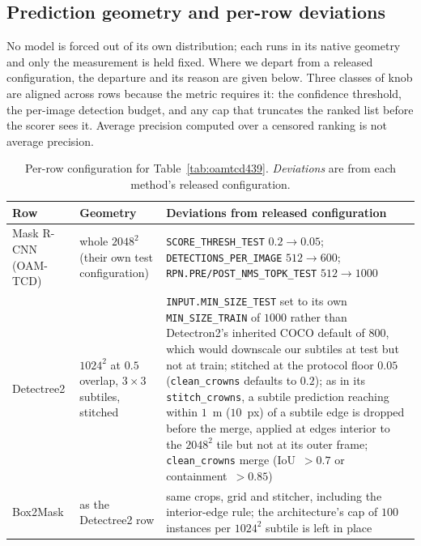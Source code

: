 \documentclass[remotesensing,article,submit,moreauthors]{Definitions/mdpi}
\begin{document}
\subsection{Prediction geometry and per-row deviations}

No model is forced out of its own distribution; each runs in its native geometry and only the measurement is held fixed. Where we depart from a released configuration, the departure and its reason are given below. Three classes of knob are aligned across rows because the metric requires it: the confidence threshold, the per-image detection budget, and any cap that truncates the ranked list before the scorer sees it. Average precision computed over a censored ranking is not average precision.

\begin{table}[H]
\begin{threeparttable}
\caption{Per-row configuration for Table~\ref{tab:oamtcd439}. \emph{Deviations} are from each method's released configuration.\label{tab:geometry}}
  
\begin{tabularx}{\textwidth}{RYD}
\toprule
\textbf{Row} & \textbf{Geometry} & \textbf{Deviations from released configuration} \\
\midrule
Mask R-CNN (OAM-TCD) & whole $2048^2$ (their own test configuration) & \texttt{SCORE\_THRESH\_TEST} $0.2 \rightarrow 0.05$; \texttt{DETECTIONS\_PER\_IMAGE} $512 \rightarrow 600$; \texttt{RPN.PRE/POST\_NMS\_TOPK\_TEST} $512 \rightarrow 1000$ \\
Detectree2 & $1024^2$ at $0.5$ overlap, $3\times3$ subtiles, stitched & \texttt{INPUT.MIN\_SIZE\_TEST} set to its own \texttt{MIN\_SIZE\_TRAIN} of $1000$ rather than Detectron2's inherited COCO default of $800$, which would downscale our subtiles at test but not at train; stitched at the protocol floor $0.05$ (\texttt{clean\_crowns} defaults to $0.2$); as in its \texttt{stitch\_crowns}, a subtile prediction reaching within $1$~m ($10$~px) of a subtile edge is dropped before the merge, applied at edges interior to the $2048^2$ tile but not at its outer frame; \texttt{clean\_crowns} merge (IoU~$>0.7$ or containment~$>0.85$) \\
Box2Mask & as the Detectree2 row & same crops, grid and stitcher, including the interior-edge rule; the architecture's cap of $100$ instances per $1024^2$ subtile is left in place \\

\end{tabularx}
\end{threeparttable}
\end{table}
\end{document}
